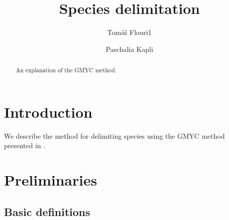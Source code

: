 \documentclass{llncs}
\begin{document}
\title{Species delimitation}


\author{Tom\'{a}\v{s} Flouri1 \and Paschalia Kapli}

\maketitle

\begin{abstract}
An explanation of the GMYC method.
\end{abstract}

\section{Introduction}

We describe the method for delimiting species using the GMYC method presented
in \cite{Fujisawa01092013}.

\section{Preliminaries}

\subsection{Basic definitions}
\end{document}

